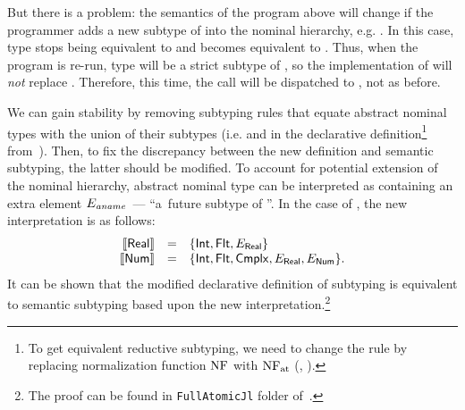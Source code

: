 But there is a problem: %
the semantics of the program above will change
if the programmer adds a new subtype of  
into the nominal hierarchy, e.g. .
In this case, type 
stops being equivalent to 
and becomes equivalent to .
Thus, when the program is re-run, type  
will be a strict subtype of ,
so the implementation of  will \emph{not} replace . 
Therefore, this time, the call  
will be dispatched to , not  as before.

We can gain stability by removing subtyping rules that 
equate abstract nominal types with the union of their subtypes
(i.e.  and  
in the declarative definition\footnote{To get 
	equivalent reductive subtyping, we need to change 
    the  rule by replacing normalization function $\mathop{\mathrm{NF}}$ with $\mathop{\mathrm{NF}_{\mathrm{at}}}$ 
    (, ).}
from~).
Then, to fix the discrepancy between the new definition 
and semantic subtyping, the latter should be modified. 
To account for potential extension of the nominal hierarchy,
abstract nominal type \aname can be interpreted 
as containing an extra element $E_\mathit{aname}$~--- ``a~future subtype of \aname''.
In the case of \BetaJulia, the new interpretation is as follows:
\[
\begin{array}{rcl}
\llbracket \mathsf{Real} \rrbracket & = & \{ \mathsf{Int}, \mathsf{Flt}, E_{\mathsf{Real}} \} \\
\llbracket \mathsf{Num} \rrbracket & = & \{ \mathsf{Int}, \mathsf{Flt}, \mathsf{Cmplx},
                           E_{\mathsf{Real}}, E_{\mathsf{Num}} \}.
\end{array}
\]
It can be shown that
the modified declarative definition of subtyping
is equivalent to semantic subtyping 
based upon the new interpretation.\footnote{The proof can be found 
	in \texttt{FullAtomicJl} folder of~\cite{bib:MiniJlCoq}.}

